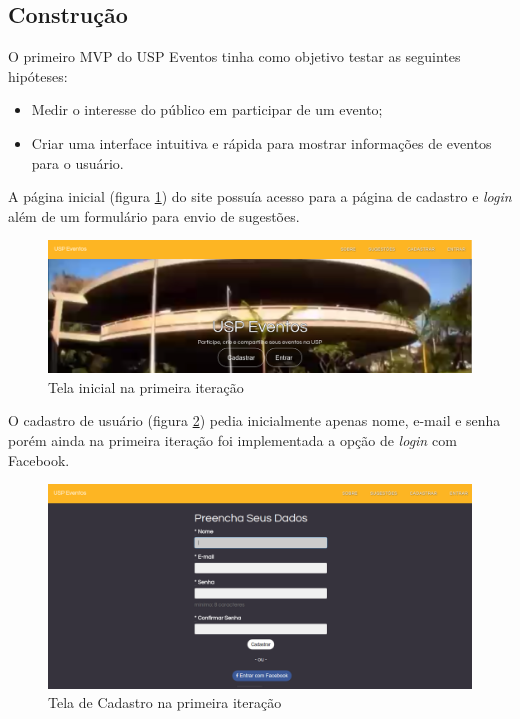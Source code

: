\subsection{Construção}
         \par O primeiro MVP do USP Eventos tinha como objetivo testar as seguintes hipóteses:
         \begin{itemize}
         \item Medir o interesse do público em participar de um evento;
         \item Criar uma interface intuitiva e rápida para mostrar informações de eventos para o usuário.
         \end{itemize}
        \par A página inicial (figura \ref{fig:landing_pagev1}) do site possuía acesso para a página de cadastro e \emph{login} além de um formulário para envio de sugestões.
        \begin{figure}[htb]
        \centering
		\includegraphics[width=15cm]{figuras/landing_pagev1}
		\caption{\label{fig:landing_pagev1} Tela inicial na primeira iteração }
		\end{figure}
        \par O cadastro de usuário (figura \ref{fig:sign_upv1}) pedia inicialmente apenas nome, e-mail e senha porém ainda na primeira iteração foi implementada a opção de \emph{login} com Facebook.
        \begin{figure}[htb]
        \centering
		\includegraphics[width=15cm]{figuras/sign_upv1}
		\caption{\label{fig:sign_upv1} Tela de Cadastro na primeira iteração}
		\end{figure}
